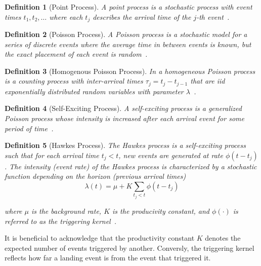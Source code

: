 \documentclass[12pt]{article}
\newtheorem{definition}{Definition}
\begin{document}
\begin{definition}[Point Process]
A point process is a stochastic process with event times $t_1, t_2, \ldots$ where each $t_j$ describes the arrival time of the $j$-th event~\cite{Rizoiu2018}.
\end{definition}
\vspace{3mm}

\begin{definition}[Poisson Process]
A Poisson process is a stochastic model for a series of discrete events where the average time in between events is known, but the exact placement of each event is random~\cite{Rizoiu2018}. 
\end{definition}
\vspace{3mm}

\begin{definition}[Homogenous Poisson Process]
In a homogeneous Poisson process is a counting process with inter-arrival times $\tau_j = t_j - t_{j-1}$ that are iid exponentially distributed random variables with parameter $\lambda$~\cite{Rizoiu2018}. 
\end{definition}
\vspace{3mm}

\begin{definition}[Self-Exciting Process] 
A self-exciting process is a generalized Poisson process whose intensity is increased after each arrival event for some period of time~\cite{Dahlqvist2022}.
\end{definition}
\vspace{3mm}

\begin{definition}[Hawkes Process]
The Hawkes process is a self-exciting process such that for each arrival time $t_j < t$, new events are generated at rate $\phi(t - t_j)$. The intensity (event rate) of the Hawkes process is characterized by a stochastic function depending on the horizon (previous arrival times)
\[
\lambda(t) = \mu + K \sum_{t_j < t}  \phi(t - t_j)
\]

where $\mu$ is the background rate, $K$ is the producivity constant, and $\phi(\cdot)$ is referred to as the triggering kernel~\cite{Rizoiu2018, Reinhart2018}.
\end{definition}
\vspace{3mm}

It is beneficial to acknowledge that the productivity constant $K$ denotes the expected number of events triggered by another. Conversly, the triggering kernel reflects how far a landing event is from the event that triggered it. 
\end{document}
